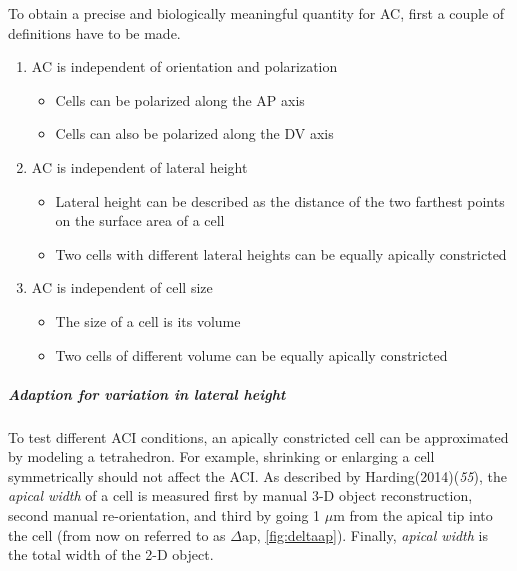 \documentclass[11pt,singlespacinge,twoside]{reedthesis} %
\providecommand{\tightlist}{%
  \setlength{\itemsep}{0pt}\setlength{\parskip}{0pt}}
\def\labelenumi{\arabic{enumi}.}
\begin{document}
To obtain a precise and biologically meaningful quantity for AC, first a couple of definitions have to be made.
\begin{enumerate}
\def\labelenumi{\arabic{enumi}.}
\tightlist
\item
  AC is independent of orientation and polarization
  \begin{itemize}
  \tightlist
  \item
    Cells can be polarized along the AP axis
  \item
    Cells can also be polarized along the DV axis
  \end{itemize}
\item
  AC is independent of lateral height
  \begin{itemize}
  \tightlist
  \item
    Lateral height can be described as the distance of the two farthest points on the surface area of a cell
  \item
    Two cells with different lateral heights can be equally apically constricted
  \end{itemize}
\item
  AC is independent of cell size
  \begin{itemize}
  \tightlist
  \item
    The size of a cell is its volume
  \item
    Two cells of different volume can be equally apically constricted
  \end{itemize}
\end{enumerate}
\hypertarget{ACI-lat}{%
\subparagraph{Adaption for variation in lateral height}\label{ACI-lat}}

To test different ACI conditions, an apically constricted cell can be approximated by modeling a tetrahedron. For example, shrinking or enlarging a cell symmetrically should not affect the ACI. As described by Harding(2014)(\emph{55}), the \emph{apical width} of a cell is measured first by manual 3-D object reconstruction, second manual re-orientation, and third by going 1 \(\mu\)m from the apical tip into the cell (from now on referred to as \(\Delta\)ap, \ref{fig:deltaap}). Finally, \emph{apical width} is the total width of the 2-D object.
\end{document}
